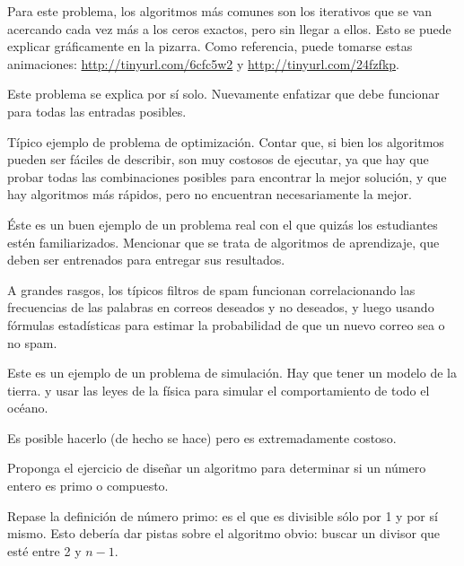 \documentclass[10pt]{article}
\begin{document}
  Para este problema,
  los algoritmos más comunes son los iterativos
  que se van acercando cada vez más a los ceros exactos,
  pero sin llegar a ellos.
  Esto se puede explicar gráficamente en la pizarra.
  Como referencia, puede tomarse estas animaciones:
  \url{http://tinyurl.com/6cfc5w2} y
  \url{http://tinyurl.com/24fzfkp}.


  Este problema se explica por sí solo.
  Nuevamente enfatizar que debe funcionar para todas las entradas posibles.


  Típico ejemplo de problema de optimización.
  Contar que, si bien los algoritmos pueden ser fáciles de describir,
  son muy costosos de ejecutar,
  ya que hay que probar todas las combinaciones posibles
  para encontrar la mejor solución,
  y que hay algoritmos más rápidos,
  pero no encuentran necesariamente la mejor.


  Éste es un buen ejemplo de un problema real
  con el que quizás los estudiantes estén familiarizados.
  Mencionar que se trata de algoritmos de aprendizaje,
  que deben ser entrenados para entregar sus resultados.
  
  A grandes rasgos,
  los típicos filtros de spam
  funcionan correlacionando las frecuencias de las palabras
  en correos deseados y no deseados,
  y luego usando fórmulas estadísticas
  para estimar la probabilidad de que un nuevo correo sea o no spam.


  Este es un ejemplo de un problema de simulación.
  Hay que tener un modelo de la tierra.
  y usar las leyes de la física
  para simular el comportamiento de todo el océano.

  Es posible hacerlo (de hecho se hace)
  pero es extremadamente costoso.


  Proponga el ejercicio de diseñar un algoritmo
  para determinar si un número entero es primo o compuesto.

  Repase la definición de número primo:
  es el que es divisible sólo por 1 y por sí mismo.
  Esto debería dar pistas sobre el algoritmo obvio:
  buscar un divisor que esté entre 2 y \(n - 1\).

\end{document}
